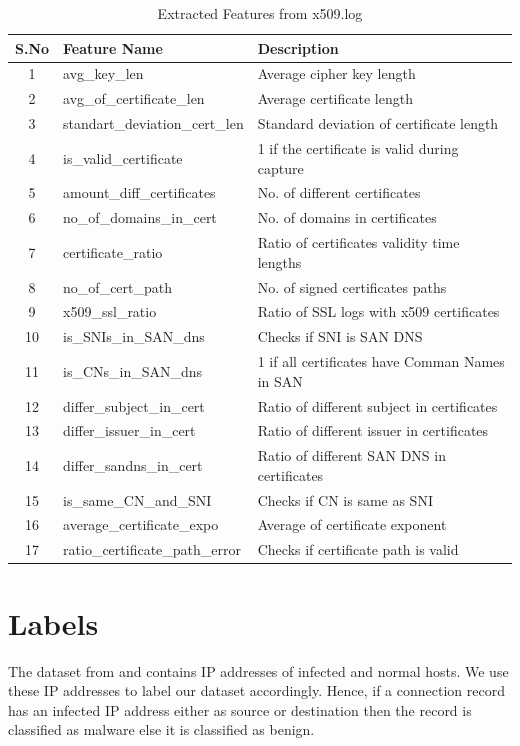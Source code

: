 \begin{table}[!htb]
	\caption{Extracted Features from x509.log\label{tab:4}}
	\begin{center}
		\begin{tabular}{c|p{}|p{}}\hline\hline
			S.No & Feature Name & \multicolumn{1}{l}{Description} \\ \hline
			1 & avg\_key\_len & Average cipher key length\\
			2 & avg\_of\_certificate\_len & Average certificate length\\
			3 & standart\_deviation\_cert\_len & Standard deviation of certificate length\\
			4 & is\_valid\_certificate & 1 if the certificate is valid during capture\\
			5 & amount\_diff\_certificates & No. of different certificates\\
			6 & no\_of\_domains\_in\_cert & No. of domains in certificates\\
			7 & certificate\_ratio & Ratio of certificates validity time lengths\\
			8 & no\_of\_cert\_path & No. of signed certificates paths\\
			9 & x509\_ssl\_ratio & Ratio of SSL logs with x509 certificates\\
			10 & is\_SNIs\_in\_SAN\_dns & Checks if SNI is SAN DNS\\
			11 & is\_CNs\_in\_SAN\_dns & 1 if all certificates have Comman Names in SAN\\
			12 & differ\_subject\_in\_cert & Ratio of different subject in certificates\\
			13 & differ\_issuer\_in\_cert & Ratio of different issuer in certificates\\
			14 & differ\_sandns\_in\_cert & Ratio of different SAN DNS in certificates\\
			15 & is\_same\_CN\_and\_SNI & Checks if CN is same as SNI\\
			16 & average\_certificate\_expo & Average of certificate exponent\\
			17 & ratio\_certificate\_path\_error & Checks if certificate path is valid\\
			\hline\hline
		\end{tabular}
	\end{center}
\end{table}

\section{Labels}

The dataset from \cite{GarciaGSZ14} and \cite{Erquiaga15} contains IP addresses of infected and normal hosts. We use these IP addresses to label our dataset accordingly. Hence, if a connection record has an infected IP address either as source or destination then the record is classified as malware else it is classified as benign. 